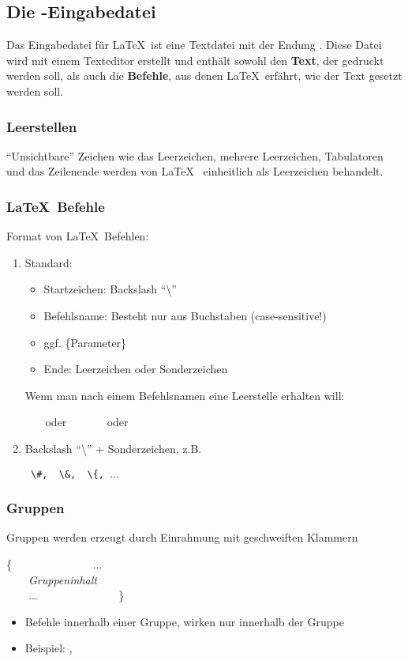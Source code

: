 \subsection{Die -Eingabedatei}
Das Eingabedatei für \LaTeX~ist eine Textdatei mit der Endung . Diese Datei wird mit einem Texteditor erstellt und enthält sowohl den \textbf{Text}, der gedruckt werden soll, als auch die \textbf{Befehle}, aus denen \LaTeX~erfährt, wie der Text gesetzt werden soll.
%
\subsubsection{Leerstellen}
``Unsichtbare'' Zeichen wie das Leerzeichen, mehrere Leerzeichen, Tabulatoren und das Zeilenende werden von \LaTeX~ einheitlich als Leerzeichen behandelt.
%
\subsubsection{\LaTeX~Befehle}
Format von \LaTeX~Befehlen:
\begin{enumerate}
	\item Standard:
	\begin{center}
	\end{center}
\begin{itemize}
	\item Startzeichen: Backslash ``\textbackslash''
	\item Befehlsname: Besteht nur aus Buchstaben (case-sensitive!)
	\item  ggf. \{Parameter\}
	\item Ende: Leerzeichen oder Sonderzeichen
\end{itemize}
	Wenn man nach einem Befehlsnamen eine Leerstelle erhalten will:
	\begin{center}
		~~~ oder~~~ ~~~ oder~~~ 
	\end{center}
\item Backslash ``\textbackslash'' + Sonderzeichen, z.B.
\begin{center}
\texttt{	\textbackslash\#,~~\textbackslash\&,~~\textbackslash\{, $\ldots$}
\end{center}
\end{enumerate}
%
\subsubsection{Gruppen}
Gruppen werden erzeugt durch Einrahmung mit geschweiften Klammern
\begin{center}
	{		\color{red}\{ }
	~~~~~~~~~~~~~~...\\
	~~~~\textit{Gruppeninhalt}\\
	~~~~...~~~~~~~~~~~~~~
	{\color{red}\}
	}
\end{center}
\begin{itemize}
	\item Befehle innerhalb einer Gruppe, wirken nur innerhalb der Gruppe
	\item Beispiel: , 
\end{itemize}


